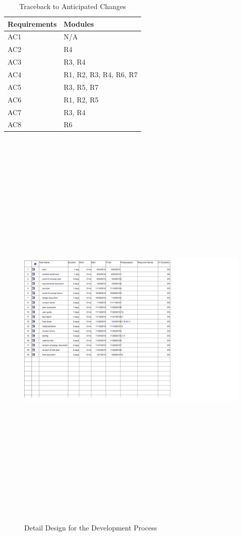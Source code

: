 \documentclass[titlepage]{article}
\begin{document}
\begin{table}[h!]
\centering
    \begin{tabular}{| p{5cm} | p{5cm} |}    \hline
    Requirements &Modules\\ \hline
    
      AC1  & N/A\\ \hline
      AC2  & R4\\ \hline
      AC3  & R3, R4\\ \hline
      AC4  & R1, R2, R3, R4, R6, R7\\ \hline
      AC5  & R3, R5, R7\\ \hline
      AC6  & R1, R2, R5\\ \hline
      AC7  & R3, R4\\ \hline
      AC8  & R6\\ \hline
      
    \end{tabular}
    \caption{Traceback to Anticipated Changes}
\label{table:Traceback to Anticipated Changes}
\end{table}

\pagebreak

\begin{figure}
	\includegraphics[width=25cm, height=20cm]{detaildesign}
	\caption{Detail Design for the Development Process}
	\label{fig:Detail Design for the Development Process}
\end{figure}
\end{document}
